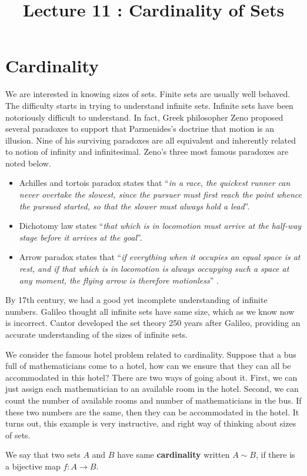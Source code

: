 \documentclass[a4paper,english,12pt]{article}   	%
\title{Lecture 11 : Cardinality of Sets}
\author{}
\begin{document}
\maketitle

\section{Cardinality}
We are interested in knowing sizes of sets. Finite sets are usually well behaved. The difficulty starts in trying to understand infinite sets. Infinite sets have been notoriously difficult to understand. In fact, Greek philosopher Zeno proposed several paradoxes to support that Parmenides's doctrine that motion is an illusion. Nine of his surviving paradoxes are all equivalent and inherently related to notion of infinity and infinitesimal. Zeno's three most famous paradoxes are noted below.
\begin{itemize}
	\item Achilles and tortois paradox states that ``\textit{in a race, the quickest runner can never overtake the slowest, since the pursuer must first reach the point whence the pursued started, so that the slower must always hold a lead}''.
	\item Dichotomy law states ``\textit{that which is in locomotion must arrive at the half-way stage before it arrives at the goal}''. 
	\item Arrow paradox states that ``\textit{if everything when it occupies an equal space is at rest, and if that which is in locomotion is always occupying such a space at any moment, the flying arrow is therefore motionless}'' .
\end{itemize}
By 17th century, we had a good yet incomplete understanding of infinite numbers. Galileo thought all infinite sets have same size, which as we know now is incorrect. Cantor developed the set theory 250 years after Galileo, providing an accurate understanding of the sizes of infinite sets.

We consider the famous hotel problem related to cardinality. Suppose that a bus full of mathematicians come to a hotel, how can we ensure that they can all be accommodated in this hotel? There are two ways of going about it. First, we can just assign each mathematician to an available room in the hotel. Second, we can count the number of available rooms and number of mathematicians in the bus. If these two numbers are the same, then they can be accommodated in the hotel. It turns out, this example is very instructive, and right way of thinking about sizes of sets.
\begin{defn} We say that two sets $A$ and $B$ have same \textbf{cardinality} written $A \sim B$, if there is a bijective map $f: A \to B$.
\end{defn}
\end{document}

